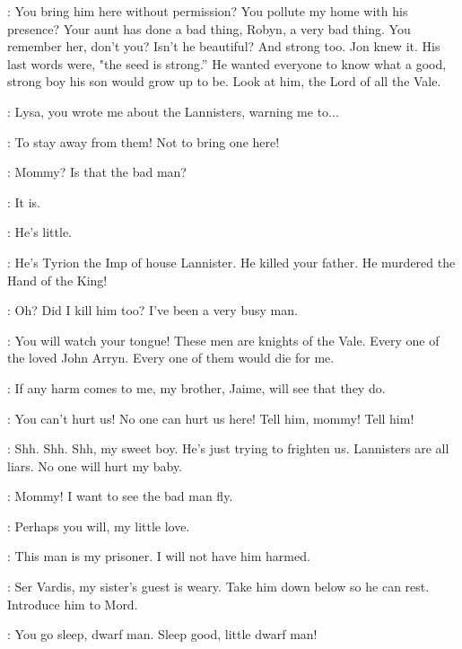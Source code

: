 
\LYSA: You bring him here without permission? You pollute my home with his presence?  Your aunt has done a bad thing, Robyn, a very bad thing. You remember her, don't you?  Isn't he beautiful? And strong too. Jon knew it. His last words were, "the seed is strong.'' He wanted everyone to know what a good, strong boy his son would grow up to be. Look at him, the Lord of all the Vale. 

\CATELYN: Lysa, you wrote me about the Lannisters, warning me to...

\LYSA: To stay away from them! Not to bring one here! 

\ROBYN: Mommy? Is that the bad man? 

\LYSA: It is. 

\ROBYN: He's little. 

\LYSA: He's Tyrion the Imp of house Lannister. He killed your father. He murdered the Hand of the King! 

\TYRION: Oh? Did I kill him too? I've been a very busy man. 

\LYSA: You will watch your tongue! These men are knights of the Vale. Every one of the loved John Arryn. Every one of them would die for me. 

\TYRION: If any harm comes to me, my brother, Jaime, will see that they do. 

\ROBYN: You can't hurt us! No one can hurt us here! Tell him, mommy! Tell him! 

\LYSA: Shh. Shh. Shh, my sweet boy. He's just trying to frighten us. Lannisters are all liars. No one will hurt my baby. 

\ROBYN: Mommy! I want to see the bad man fly. 

\LYSA: Perhaps you will, my little love. 

\CATELYN: This man is my prisoner. I will not have him harmed. 

\LYSA: Ser Vardis, my sister's guest is weary. Take him down below so he can rest. Introduce him to Mord. 


\MORD: You go sleep, dwarf man. Sleep good, little dwarf man! 


